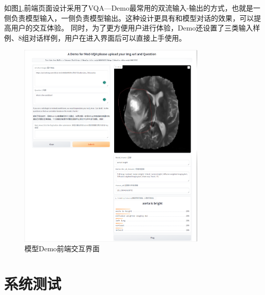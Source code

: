 如图\ref{sys_demo},前端页面设计采用了VQA—Demo最常用的双流输入-输出的方式，也就是一侧负责模型输入，一侧负责模型输出。这种设计更具有和模型对话的效果，可以提高用户的交互体验。
同时，为了更方便用户进行体验，Demo还设置了三类输入样例、8组对话样例，用户在进入界面后可以直接上手使用。
\begin{figure}[htbp]
	\centering	
	\includegraphics[width=0.8\textwidth]{Fig/myfig/chapter5/sys_demo.png}  %
	\caption{\label{sys_demo}模型Demo前端交互界面} 
\end{figure}

\section{系统测试}
